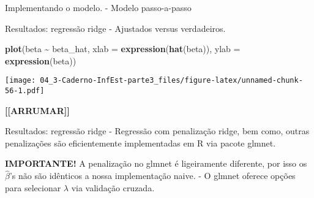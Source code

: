 \documentclass[
]{article}
\newenvironment{Shaded}{\begin{snugshade}}{\end{snugshade}}
\newcommand{\AttributeTok}[1]{\textcolor[rgb]{0.13,0.29,0.53}{#1}}
\newcommand{\DecValTok}[1]{\textcolor[rgb]{0.00,0.00,0.81}{#1}}
\newcommand{\DocumentationTok}[1]{\textcolor[rgb]{0.56,0.35,0.01}{\textbf{\textit{#1}}}}
\newcommand{\FloatTok}[1]{\textcolor[rgb]{0.00,0.00,0.81}{#1}}
\newcommand{\FunctionTok}[1]{\textcolor[rgb]{0.13,0.29,0.53}{\textbf{#1}}}
\newcommand{\NormalTok}[1]{#1}
\newcommand{\OtherTok}[1]{\textcolor[rgb]{0.56,0.35,0.01}{#1}}
\newcommand{\SpecialCharTok}[1]{\textcolor[rgb]{0.81,0.36,0.00}{\textbf{#1}}}
\begin{document}
Implementando o modelo. - Modelo passo-a-passo

\begin{Shaded}
\end{Shaded}

Resultados: regressão ridge - Ajustados versus verdadeiros.

\begin{Shaded}
\begin{Highlighting}[]
\FunctionTok{plot}\NormalTok{(beta }\SpecialCharTok{\textasciitilde{}}\NormalTok{ beta\_hat, }\AttributeTok{xlab =} \FunctionTok{expression}\NormalTok{(}\FunctionTok{hat}\NormalTok{(beta)), }\AttributeTok{ylab =} \FunctionTok{expression}\NormalTok{(beta))}
\end{Highlighting}
\end{Shaded}

\texttt{[image: 04\_3-Caderno-InfEst-parte3\_files/figure-latex/unnamed-chunk-56-1.pdf]}

\textbf{{[}{[}ARRUMAR{]}{]}}

Resultados: regressão ridge - Regressão com penalização ridge, bem como,
outras penalizações são eficientemente implementadas em R via pacote
glmnet.

\textbf{IMPORTANTE!} A penalização no glmnet é ligeiramente diferente,
por isso os \(\hat{\beta}\)'s não são idênticos a nossa implementação
naive. - O glmnet oferece opções para selecionar \(\lambda\) via
validação cruzada.
\end{document}
